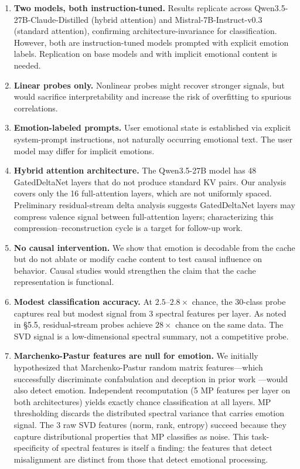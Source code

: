 \documentclass[11pt,a4paper]{article}
\begin{document}
\begin{enumerate}[nosep]
    \item \textbf{Two models, both instruction-tuned.} Results replicate across Qwen3.5-27B-Claude-Distilled (hybrid attention) and Mistral-7B-Instruct-v0.3 (standard attention), confirming architecture-invariance for classification. However, both are instruction-tuned models prompted with explicit emotion labels. Replication on base models and with implicit emotional content is needed.

    \item \textbf{Linear probes only.} Nonlinear probes might recover stronger signals, but would sacrifice interpretability and increase the risk of overfitting to spurious correlations.

    \item \textbf{Emotion-labeled prompts.} User emotional state is established via explicit system-prompt instructions, not naturally occurring emotional text. The user model may differ for implicit emotions.

    \item \textbf{Hybrid attention architecture.} The Qwen3.5-27B model has 48 GatedDeltaNet layers that do not produce standard KV pairs. Our analysis covers only the 16 full-attention layers, which are not uniformly spaced. Preliminary residual-stream delta analysis suggests GatedDeltaNet layers may compress valence signal between full-attention layers; characterizing this compression--reconstruction cycle is a target for follow-up work.

    \item \textbf{No causal intervention.} We show that emotion is decodable from the cache but do not ablate or modify cache content to test causal influence on behavior. Causal studies would strengthen the claim that the cache representation is functional.

    \item \textbf{Modest classification accuracy.} At $2.5$--$2.8\times$ chance, the 30-class probe captures real but modest signal from 3 spectral features per layer. As noted in \S5.5, residual-stream probes achieve $28\times$ chance on the same data. The SVD signal is a low-dimensional spectral summary, not a competitive probe.

    \item \textbf{Marchenko-Pastur features are null for emotion.} We initially hypothesized that Marchenko-Pastur random matrix features---which successfully discriminate confabulation and deception in prior work \citep{lyra2026oracle}---would also detect emotion. Independent recomputation (5 MP features per layer on both architectures) yields exactly chance classification at all layers. MP thresholding discards the distributed spectral variance that carries emotion signal. The 3 raw SVD features (norm, rank, entropy) succeed because they capture distributional properties that MP classifies as noise. This task-specificity of spectral features is itself a finding: the features that detect misalignment are distinct from those that detect emotional processing.


\end{enumerate}
\end{document}
